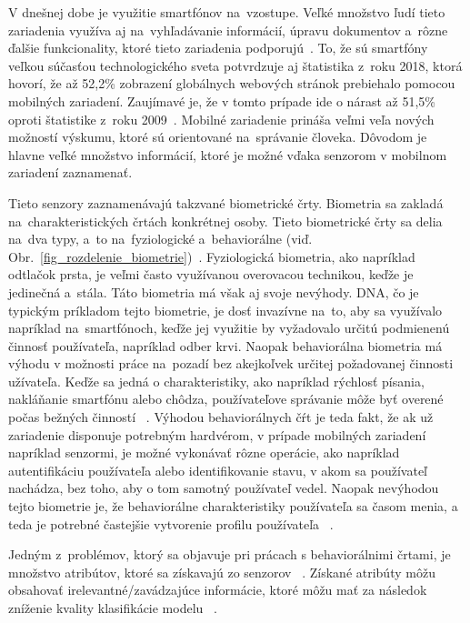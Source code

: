 \documentclass[runningheads]{llncs}
\begin{document}
V dnešnej dobe je využitie smartfónov na~vzostupe. 
Veľké množstvo ľudí tieto zariadenia využíva aj na~vyhľadávanie informácií, 
úpravu dokumentov a~rôzne ďalšie funkcionality, 
ktoré tieto zariadenia podporujú~\cite{ref_bomhold}. 
To, že sú smartfóny veľkou súčasťou technologického sveta potvrdzuje aj 
štatistika z~roku 2018, ktorá hovorí, že až 52,2\% 
zobrazení globálnych webových stránok prebiehalo pomocou mobilných zariadení. 
Zaujímavé je, že v tomto prípade ide o nárast až 51,5\% 
oproti štatistike z~roku 2009~\cite{ref_statista19}. Mobilné zariadenie
prináša veľmi veľa nových možností výskumu, ktoré sú orientované na~správanie človeka.
Dôvodom je hlavne veľké množstvo informácií, ktoré je možné vďaka senzorom v mobilnom 
zariadení zaznamenať. 

Tieto senzory zaznamenávajú takzvané biometrické črty.  
Biometria sa zakladá na~charakteristických črtách konkrétnej osoby. Tieto biometrické 
črty sa delia na~dva typy, a~to na~fyziologické a~behaviorálne 
(viď. Obr.~\ref{fig_rozdelenie_biometrie})~\cite{ref_teh}. Fyziologická biometria, 
ako napríklad odtlačok prsta, je veľmi často využívanou overovacou technikou, 
keďže je jedinečná a~stála. Táto biometria má však aj svoje nevýhody. 
DNA, čo je typickým príkladom tejto biometrie, je dosť invazívne na~to, 
aby sa využívalo napríklad na~smartfónoch, keďže jej využitie by 
vyžadovalo určitú podmienenú činnosť používateľa, napríklad odber krvi. 
Naopak behaviorálna biometria má výhodu v možnosti práce na~pozadí bez akejkoľvek 
určitej požadovanej činnosti užívateľa. Keďže sa jedná o charakteristiky, 
ako napríklad rýchlosť písania, nakláňanie smartfónu alebo chôdza, 
používateľove správanie môže byť overené počas bežných činností ~\cite{ref_teh}.
Výhodou behaviorálnych čŕt je teda fakt, 
že ak už zariadenie disponuje potrebným hardvérom, 
v prípade mobilných zariadení napríklad senzormi, 
je možné vykonávať rôzne operácie, ako napríklad autentifikáciu používateľa alebo 
identifikovanie stavu, v akom sa používateľ nachádza, bez toho, aby o 
tom samotný používateľ vedel. Naopak nevýhodou tejto biometrie je, 
že behaviorálne charakteristiky používateľa sa časom menia, 
a teda je potrebné častejšie vytvorenie profilu používateľa ~\cite{ref_seyd}. 

Jedným z~problémov, ktorý sa objavuje pri prácach s behaviorálnimi črtami, 
je množstvo atribútov, ktoré sa získavajú zo senzorov ~\cite{ref_nascimento}. 
Získané atribúty môžu obsahovať irelevantné/zavádzajúce informácie, ktoré
môžu mať za následok zníženie kvality klasifikácie modelu
~\cite{ref_babatunde,ref_lu,ref_nascimento,ref_smith,ref_zhao}. 
\end{document}
